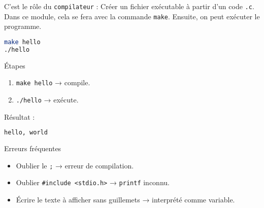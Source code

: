 C'est le rôle du \texttt{compilateur} : Créer un fichier exécutable à partir d'un code \texttt{.c}. Dans ce module, cela se fera avec la commande \texttt{make}. Ensuite, on peut exécuter le programme.
\begin{lstlisting}[language=bash,style=console]
make hello
./hello
\end{lstlisting}

\begin{UPSTIinfor}{Étapes}
	\begin{enumerate}
		\item \texttt{make hello} → compile.
		\item \texttt{./hello} → exécute.
	\end{enumerate}
\end{UPSTIinfor}

Résultat :
\begin{lstlisting}[language=bash,style=console]
hello, world
\end{lstlisting}

\begin{UPSTIwarning}{Erreurs fréquentes}

	\begin{itemize}
		\item Oublier le \texttt{;} → erreur de compilation.
		\item Oublier \texttt{\#include <stdio.h>} → \texttt{printf} inconnu.
		\item Écrire le texte à afficher sans guillemets → interprété comme variable.
	\end{itemize}
\end{UPSTIwarning}